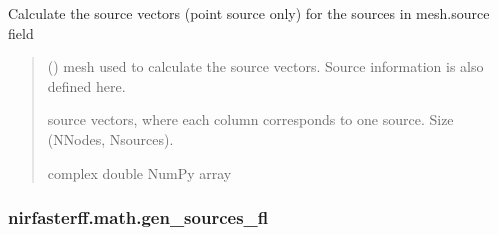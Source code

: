 \documentclass[letterpaper,10pt,english]{sphinxmanual}
\begin{document}
\begin{fulllineitems}
\label{\detokenize{_autosummary/nirfasterff.math.gen_sources:nirfasterff.math.gen_sources}}
\pysigstartsignatures
\pysiglinewithargsret
{}
{}
{}
\pysigstopsignatures
\sphinxAtStartPar
Calculate the source vectors (point source only) for the sources in mesh.source field
\begin{quote}\begin{description}
\sphinxAtStartPar
{} () \textendash{} mesh used to calculate the source vectors. Source information is also defined here.

\sphinxAtStartPar
{} \textendash{} source vectors, where each column corresponds to one source. Size (NNodes, Nsources).

\sphinxAtStartPar
complex double NumPy array

\end{description}\end{quote}

\end{fulllineitems}


\sphinxstepscope


\subsubsection{nirfasterff.math.gen\_sources\_fl}
\label{\detokenize{_autosummary/nirfasterff.math.gen_sources_fl:nirfasterff-math-gen-sources-fl}}\label{\detokenize{_autosummary/nirfasterff.math.gen_sources_fl::doc}}
\end{document}
